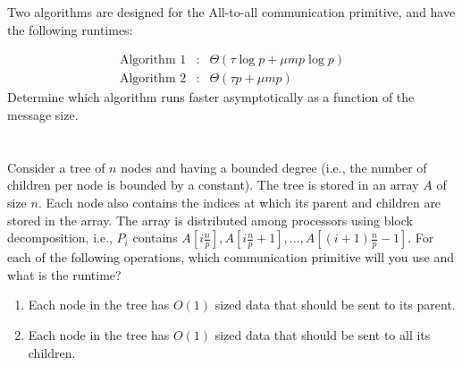 \documentclass{article}
\newcommand{\aln}[1]{\begin{align*}#1\end{align*}}
\begin{document}
\section{}
Two algorithms are designed for the All-to-all communication primitive, and have
the following runtimes:

\aln{
  \text{Algorithm 1} &:&\Theta\left(\tau\log{p} + \mu m p \log{p}\right)\\
  \text{Algorithm 2} &:&\Theta\left(\tau p + \mu m p\right)
}
Determine which algorithm runs faster asymptotically as a function of the message size.

\section{}
Consider a tree of $n$ nodes and having a bounded degree (i.e., the number of children per node is bounded by a constant).
The tree is stored in an array $A$ of size $n$.
Each node also contains the indices at which its parent and children are stored in the array.
The array is distributed among processors using block decomposition, i.e., $P_i$ contains $A[i\frac{n}{p}],A[i\frac{n}{p} + 1], \dots, A[(i + 1)\frac{n}{p} - 1].$
For each of the following operations, which communication primitive will you use and what is the runtime?

\begin{enumerate}[label=(\alph*)]
  \item Each node in the tree has $O(1)$ sized data that should be sent to its parent.
  \item Each node in the tree has $O(1)$ sized data that should be sent to all its children.
\end{enumerate}
\end{document}
